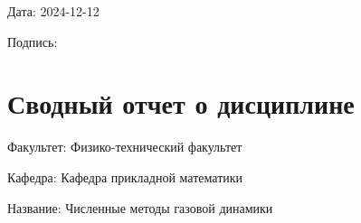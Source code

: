 \documentclass[a4paper,12pt]{article}
\begin{document}
Дата: 2024-12-12

Подпись: \underline{\hspace{3cm}}

\section*{Сводный отчет о дисциплине}
Факультет: Физико-технический факультет

Кафедра: Кафедра прикладной математики

Название: Численные методы газовой динамики
\end{document}
